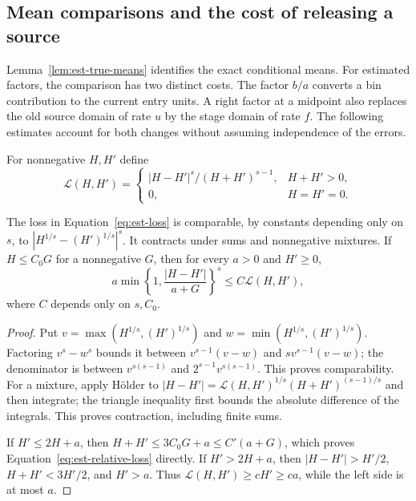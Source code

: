\subsection{Mean comparisons and the cost of releasing a source}

Lemma~\ref{lem:est-true-means} identifies the exact conditional means.
For estimated factors, the comparison has two distinct costs.  The
factor $b/a$ converts a bin contribution to the current entry units.
A right factor at a midpoint also replaces the old source domain of
rate $u$ by the stage domain of rate $f$.  The following estimates
account for both changes without assuming independence of the errors.

For nonnegative $H,H'$ define
\begin{equation}
 \mathcal L(H,H')=
 \begin{cases}|H-H'|^s/(H+H')^{s-1},&H+H'>0,\\0,&H=H'=0.
 \end{cases}
 \label{eq:est-loss}
\end{equation}

\begin{lemma}\label{lem:est-loss}
The loss in Equation~\eqref{eq:est-loss} is comparable, by constants
depending only on $s$, to $|H^{1/s}-(H')^{1/s}|^s$.  It contracts under
sums and nonnegative mixtures.  If $H\le C_0G$ for a nonnegative $G$, then
for every $a>0$ and $H'\ge0$,
\begin{equation}
 a\min\left\{1,\frac{|H-H'|}{a+G}\right\}^{s}
       \le C\mathcal L(H,H'),
 \label{eq:est-relative-loss}
\end{equation}
where $C$ depends only on $s,C_0$.
\end{lemma}
\begin{proof}
Put $v=\max(H^{1/s},(H')^{1/s})$ and
$w=\min(H^{1/s},(H')^{1/s})$.  Factoring $v^s-w^s$ bounds it between
$v^{s-1}(v-w)$ and $sv^{s-1}(v-w)$; the denominator is between
$v^{s(s-1)}$ and $2^{s-1}v^{s(s-1)}$.  This proves comparability.
For a mixture, apply H\"older to
$|H-H'|=\mathcal L(H,H')^{1/s}(H+H')^{(s-1)/s}$ and then integrate;
the triangle inequality first bounds the absolute difference of the
integrals.  This proves contraction, including finite sums.

If $H'\le2H+a$, then $H+H'\le3C_0G+a\le C'(a+G)$, which proves
Equation~\eqref{eq:est-relative-loss} directly.  If $H'>2H+a$, then
$|H-H'|>H'/2$, $H+H'<3H'/2$, and $H'>a$.
Thus $\mathcal L(H,H')\ge cH'\ge ca$, while the left side is at most $a$.
\end{proof}

